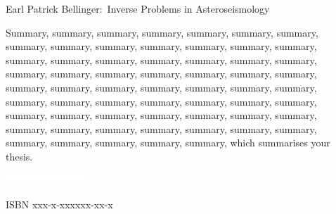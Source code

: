 \documentclass{article}
\begin{document}
\newpage

\null\vspace{-5cm}

\hspace*{-1.2cm}\colorbox{bcol}{\parbox[b][22cm][c]{15.2cm}{\null\hfill}}

\vspace{-19.4cm}


\hspace*{7mm}\begin{minipage}[t][17.5cm]{12cm}

\fontsize{12}{15}\selectfont

\textcolor{tcol}{Earl Patrick Bellinger:~Inverse Problems in Asteroseismology}%

\vspace{0.5cm}

\fontsize{12}{15}\selectfont

\textcolor{scol}{Summary, summary, summary, summary, summary, summary, summary, summary, summary, summary, summary, summary, summary, summary, summary, summary, summary, summary, summary, summary, summary, summary, summary, summary, summary, summary, summary, summary, summary, summary, summary, summary, summary, summary, summary, summary, summary, summary, summary, summary, summary, summary, summary, summary, summary, summary, summary, summary, summary, summary, summary, summary, summary, summary, summary, summary, summary, summary, summary, summary, summary, which summarises your thesis. }%

\vfill

\parbox[b]{30mm}{\includegraphics[width=30mm]{uni-edition-white.pdf}}\hfill\textcolor{scol}{ISBN xxx-x-xxxxxx-xx-x}%

\end{minipage}

\newpage
\null\vspace{-5cm}

\hspace*{-1.2cm}\colorbox{bcol}{\parbox[b][22cm][c]{15.2cm}{\null\hfill}}

\fontsize{12}{15}\selectfont%

\vspace{-19cm}%
\hspace*{6cm}%
\end{document}
